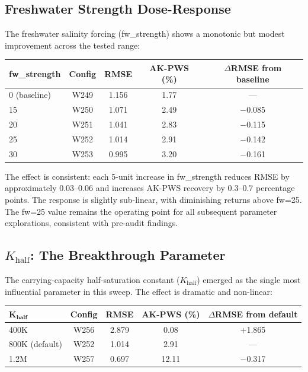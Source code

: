 \documentclass[11pt,a4paper]{article}
\begin{document}
\subsection{Freshwater Strength Dose-Response}

The freshwater salinity forcing (fw\_strength) shows a monotonic but modest improvement across the tested range:

\begin{center}
\begin{tabular}{lcccc}
\toprule
\textbf{fw\_strength} & \textbf{Config} & \textbf{RMSE} & \textbf{AK-PWS (\%)} & \textbf{$\Delta$RMSE from baseline} \\
\midrule
0 (baseline) & W249 & 1.156 & 1.77 & --- \\
15 & W250 & 1.071 & 2.49 & $-$0.085 \\
20 & W251 & 1.041 & 2.83 & $-$0.115 \\
25 & W252 & 1.014 & 2.91 & $-$0.142 \\
30 & W253 & 0.995 & 3.20 & $-$0.161 \\
\bottomrule
\end{tabular}
\end{center}

The effect is consistent: each 5-unit increase in fw\_strength reduces RMSE by approximately 0.03--0.06 and increases AK-PWS recovery by 0.3--0.7 percentage points. The response is slightly sub-linear, with diminishing returns above fw=25. The fw=25 value remains the operating point for all subsequent parameter explorations, consistent with pre-audit findings.

\subsection{\texorpdfstring{$K_{\text{half}}$}{K\_half}: The Breakthrough Parameter}
\label{sec:khalf}

The carrying-capacity half-saturation constant ($K_{\text{half}}$) emerged as the single most influential parameter in this sweep. The effect is dramatic and non-linear:

\begin{center}
\begin{tabular}{lcccc}
\toprule
$\boldsymbol{K_{\text{half}}}$ & \textbf{Config} & \textbf{RMSE} & \textbf{AK-PWS (\%)} & \textbf{$\Delta$RMSE from default} \\
\midrule
400K & W256 & 2.879 & 0.08 & $+$1.865 \\
800K (default) & W252 & 1.014 & 2.91 & --- \\
1.2M & W257 & 0.697 & 12.11 & $-$0.317 \\
\bottomrule
\end{tabular}
\end{center}
\end{document}
